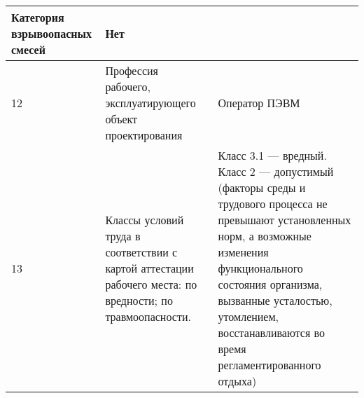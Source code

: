 \begin{longtable}[h]{|p{}|p{}|p{}|}
    Категория взрывоопасных смесей &
    Нет
  \\ \hline
    12 &
    Профессия рабочего, эксплуатирующего объект проектирования &
    Оператор ПЭВМ
  \\ \hline
    13 &
    Классы условий труда в соответствии с картой аттестации рабочего места:\newline
    по вредности;\newline
    по травмоопасности. &
    Класс 3.1 --- вредный.\newline
    Класс 2 --- допустимый (факторы среды и трудового процесса не превышают установленных норм, а возможные изменения функционального состояния организма, вызванные усталостью, утомлением, восстанавливаются во время регламентированного отдыха)
  \\ \hline
\end{longtable}
\vspace{1cm}
